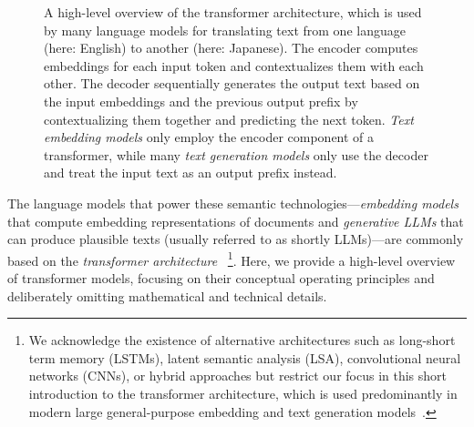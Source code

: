 \begin{figure}
	\centering
	\caption[A high-level overview of the transformer architecture.]{
		A high-level overview of the transformer architecture, which is used by many language models for translating text from one language (here: English) to another (here: Japanese).
		The encoder computes embeddings for each input token and contextualizes them with each other.
		The decoder sequentially generates the output text based on the input embeddings and the previous output prefix by contextualizing them together and predicting the next token.
		\emph{Text embedding models} only employ the encoder component of a transformer, while many \emph{text generation models} only use the decoder and treat the input text as an output prefix instead.
	}
	\label{fig:background/semtec/transformer}
\end{figure}

The language models that power these semantic technologies---\emph{embedding models} that compute embedding representations of documents and \emph{generative LLMs} that can produce plausible texts (usually referred to as shortly LLMs)---are commonly based on the \emph{transformer architecture}~\cite{vaswani2017attention}%
\footnote{
	We acknowledge the existence of alternative architectures such as long-short term memory (LSTMs), latent semantic analysis (LSA), convolutional neural networks (CNNs), or hybrid approaches but restrict our focus in this short introduction to the transformer architecture, which is used predominantly in modern large general-purpose embedding and text generation models~\cite{oralkbekova2023contemporary}.
}.
Here, we provide a high-level overview of transformer models, focusing on their conceptual operating principles and deliberately omitting mathematical and technical details.

